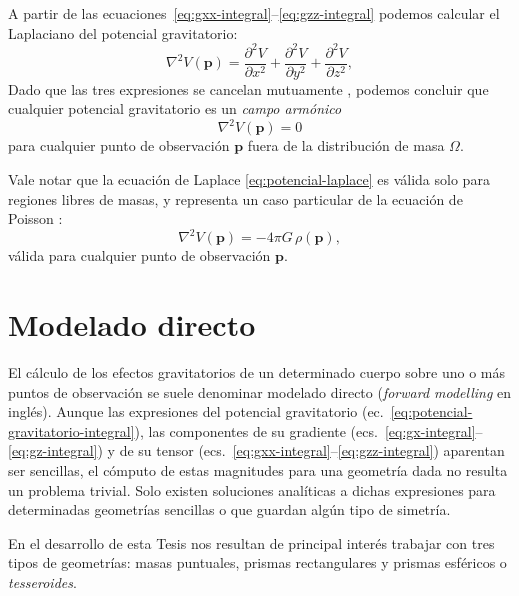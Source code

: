 A partir de las ecuaciones~\ref{eq:gxx-integral}--\ref{eq:gzz-integral} podemos
calcular el Laplaciano del potencial gravitatorio:
%
\begin{equation}
    \nabla^2 V(\mathbf{p}) =
        \frac{\partial^2 V}{\partial x^2}
        + \frac{\partial^2 V}{\partial y^2}
        + \frac{\partial^2 V}{\partial z^2},
\end{equation}
%
Dado que las tres expresiones se cancelan mutuamente
\citep{blakely1995}, podemos concluir que cualquier potencial gravitatorio es
un \emph{campo armónico}
%
\begin{equation}
    \nabla^2 V(\mathbf{p}) = 0
    \label{eq:potencial-laplace}
\end{equation}
%
para cualquier punto de observación $\mathbf{p}$ fuera de la
distribución de masa $\Omega$.

Vale notar que la ecuación de Laplace \ref{eq:potencial-laplace} es válida
solo para regiones libres de masas, y representa un caso particular de la
ecuación de Poisson \citep{blakely1995}:
%
\begin{equation}
    \nabla^2 V(\mathbf{p}) = -4\pi G \, \rho(\mathbf{p}),
    \label{eq:potencial-poisson}
\end{equation}
%
válida para cualquier punto de observación $\mathbf{p}$.


\section{Modelado directo}

El cálculo de los efectos gravitatorios de un determinado cuerpo sobre uno
o más puntos de observación se suele denominar modelado directo (\emph{forward
modelling} en inglés).
Aunque las expresiones del potencial gravitatorio
(ec.~\ref{eq:potencial-gravitatorio-integral}),
las componentes de su gradiente
(ecs.~\ref{eq:gx-integral}--\ref{eq:gz-integral})
y de su tensor (ecs.~\ref{eq:gxx-integral}--\ref{eq:gzz-integral})
aparentan ser sencillas, el cómputo de estas magnitudes para una geometría dada
no resulta un problema trivial.
Solo existen soluciones analíticas a dichas expresiones para determinadas
geometrías sencillas o que guardan algún tipo de simetría.

En el desarrollo de esta Tesis nos resultan de principal interés trabajar con
tres tipos de geometrías: masas puntuales, prismas rectangulares y prismas
esféricos o \emph{tesseroides}.


